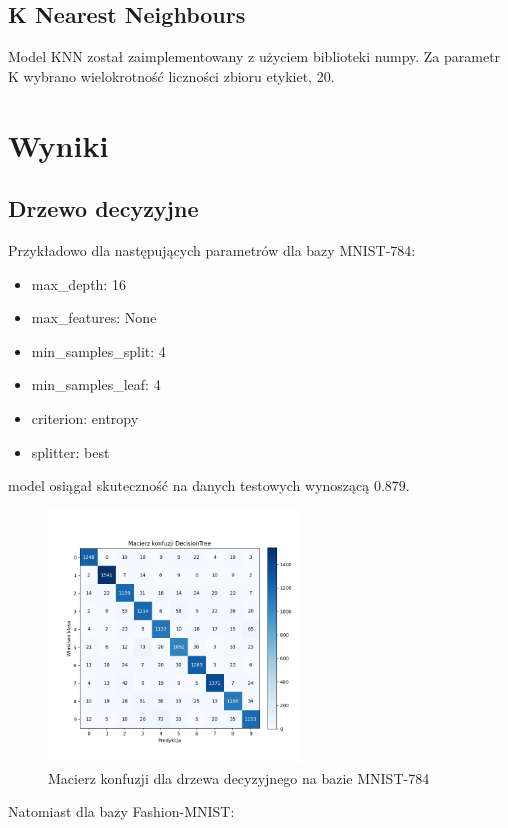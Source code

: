 \documentclass{article}
\begin{document}
\subsection{K Nearest Neighbours}
Model KNN został zaimplementowany z użyciem biblioteki numpy. Za parametr K 
wybrano wielokrotność liczności zbioru etykiet, 20.


\section{Wyniki}
\subsection{Drzewo decyzyjne}
Przykładowo dla następujących parametrów dla bazy MNIST-784:

\begin{itemize}
    \item max\_depth: 16
    \item max\_features: None
    \item min\_samples\_split: 4
    \item min\_samples\_leaf: 4
    \item criterion: entropy
    \item splitter: best
\end{itemize}
model osiągał skuteczność na danych testowych wynoszącą $0.879$.

\begin{figure}[H]
    \centering
    \includegraphics[width=0.6\textwidth]{../Saves/Trees/mnist-784/DecisionTree_mnist_784_conf_mat.png}
    \caption{Macierz konfuzji dla drzewa decyzyjnego na bazie MNIST-784}
\end{figure}

Natomiast dla bazy Fashion-MNIST:
\end{document}
